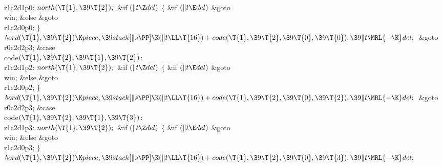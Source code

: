 \\{r1c2d1p0}:\5
${}\\{north}(\T{1},\39\T{2});{}$\6
\&{if} ${}(\|t\Z\\{del}){}$\5
${}\{{}$\5
\1\&{if} ${}(\|t\E\\{del}){}$\1\5
\&{goto} \\{win};\5
\2\&{else}\1\5
\&{goto} \\{r1c2d0p0};\5
\2${}\}{}$\2\6
${}\\{bord}(\T{1},\39\T{2})\K\\{piece},\39\\{stack}[\|s\PP]\K(\|t\LL\T{16})+%
\\{code}(\T{1},\39\T{2},\39\T{0},\39\T{0}),\39\|t\MRL{-{\K}}\\{del};{}$\6
\&{goto} \\{r0c2d2p3};\6
\4\&{case} \\{code}${}(\T{1},\39\T{2},\39\T{1},\39\T{2}){}$:\5
\\{r1c2d1p2}:\5
${}\\{north}(\T{1},\39\T{2});{}$\6
\&{if} ${}(\|t\Z\\{del}){}$\5
${}\{{}$\5
\1\&{if} ${}(\|t\E\\{del}){}$\1\5
\&{goto} \\{win};\5
\2\&{else}\1\5
\&{goto} \\{r1c2d0p2};\5
\2${}\}{}$\2\6
${}\\{bord}(\T{1},\39\T{2})\K\\{piece},\39\\{stack}[\|s\PP]\K(\|t\LL\T{16})+%
\\{code}(\T{1},\39\T{2},\39\T{0},\39\T{2}),\39\|t\MRL{-{\K}}\\{del};{}$\6
\&{goto} \\{r0c2d2p3};\6
\4\&{case} \\{code}${}(\T{1},\39\T{2},\39\T{1},\39\T{3}){}$:\5
\\{r1c2d1p3}:\5
${}\\{north}(\T{1},\39\T{2});{}$\6
\&{if} ${}(\|t\Z\\{del}){}$\5
${}\{{}$\5
\1\&{if} ${}(\|t\E\\{del}){}$\1\5
\&{goto} \\{win};\5
\2\&{else}\1\5
\&{goto} \\{r1c2d0p3};\5
\2${}\}{}$\2\6
${}\\{bord}(\T{1},\39\T{2})\K\\{piece},\39\\{stack}[\|s\PP]\K(\|t\LL\T{16})+%
\\{code}(\T{1},\39\T{2},\39\T{0},\39\T{3}),\39\|t\MRL{-{\K}}\\{del};{}$\6

